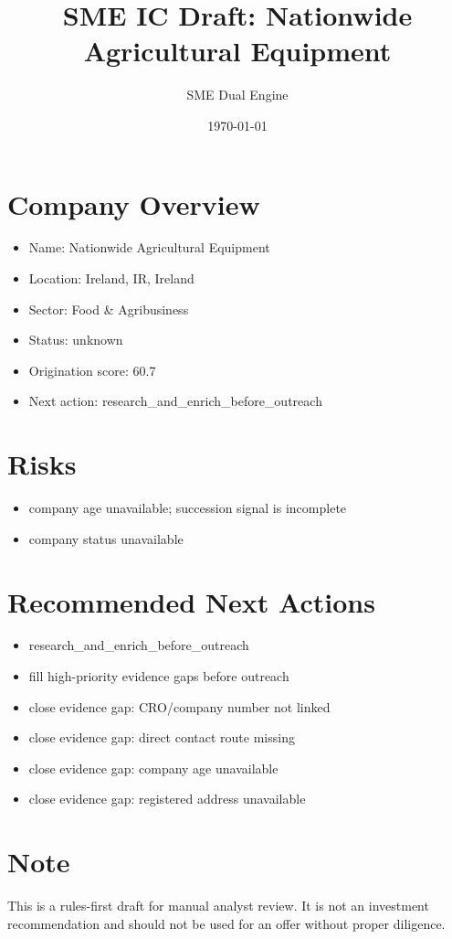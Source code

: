 \documentclass[11pt,a4paper]{article}
\title{SME IC Draft: Nationwide Agricultural Equipment}
\author{SME Dual Engine}
\date{\today}
\begin{document}
\maketitle
\section*{Company Overview}
\begin{itemize}[leftmargin=1.4em]
\item Name: Nationwide Agricultural Equipment
\item Location: Ireland, IR, Ireland
\item Sector: Food \& Agribusiness
\item Status: unknown
\item Origination score: 60.7
\item Next action: research\_and\_enrich\_before\_outreach
\end{itemize}
\section*{Risks}
\begin{itemize}[leftmargin=1.4em]
\item company age unavailable; succession signal is incomplete
\item company status unavailable
\end{itemize}
\section*{Recommended Next Actions}
\begin{itemize}[leftmargin=1.4em]
\item research\_and\_enrich\_before\_outreach
\item fill high-priority evidence gaps before outreach
\item close evidence gap: CRO/company number not linked
\item close evidence gap: direct contact route missing
\item close evidence gap: company age unavailable
\item close evidence gap: registered address unavailable
\end{itemize}
\section*{Note}
This is a rules-first draft for manual analyst review. It is not an investment
recommendation and should not be used for an offer without proper diligence.
\end{document}

